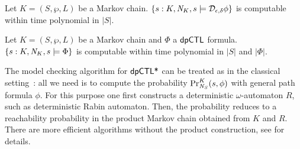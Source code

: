 \begin{proposition}
  Let $K = (S, \wp, L)$ be a Markov chain.
  $\{ s : K, \neighbor{K}, s \models \dpriv{\epsilon}{\delta} \phi \}$ is
  computable within time polynomial in $|S|$.
\end{proposition}

\begin{corollary}
  Let $K = (S, \wp, L)$ be a Markov chain and $\Phi$ a $\dpCTL$
  formula. $\{ s : K, \neighbor{K}, s \models \Phi \}$ is
  computable within time polynomial in $|S|$ and $|\Phi|$.
\end{corollary}

The model checking algorithm for $\dpCTLstar$ can be treated as in the classical setting~\cite{BK:08:PMC}:  all we need is to  compute the  probability
  $\myPr{s}{K}{\neighbor{S}}{\phi}$ with general path formula $\phi$. For this purpose one first constructs a deterministic $\omega$-automaton $R$, such as deterministic Rabin automaton. Then, the probability reduces to a
  reachability probability in the product Markov chain obtained from $K$ and $R$. There are more efficient algorithms without the product construction, see \cite{CY95,CSS03,BaierKKKMW16} for details.
